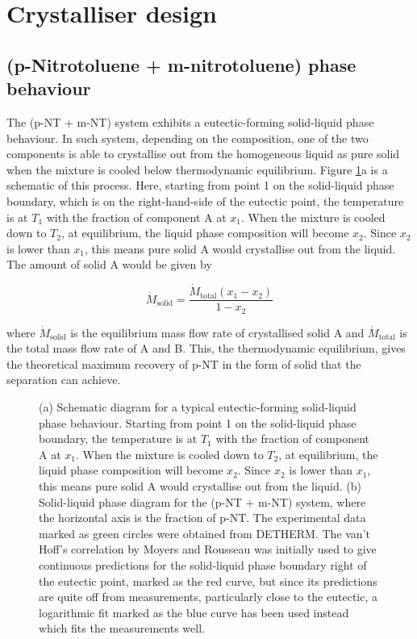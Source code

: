 \section{Crystalliser design}

\subsection{(p-Nitrotoluene + m-nitrotoluene) phase behaviour}

The (p-NT + m-NT) system exhibits a eutectic-forming solid-liquid phase behaviour. In such system, depending on the composition, one of the two components is able to crystallise out from the homogeneous liquid as pure solid when the mixture is cooled below thermodynamic equilibrium. \cite{seader_separation_2011} Figure \ref{fig:eutectic schematic}a is a schematic of this process. Here, starting from point 1 on the solid-liquid phase boundary, which is on the right-hand-side of the eutectic point, the temperature is at $T_1$ with the fraction of component A at $x_1$. When the mixture is cooled down to $T_2$, at equilibrium, the liquid phase composition will become $x_2$. Since $x_2$ is lower than $x_1$, this means pure solid A would crystallise out from the liquid. The amount of solid A would be given by

\begin{equation}\label{eq:amount solid A equilibrium}
    \dot{M}_{\mathrm{solid}} = \frac{\dot{M}_{\mathrm{total}} (x_1 - x_2)}{1 - x_2}
\end{equation}

\noindent where $\dot{M}_{\mathrm{solid}}$ is the equilibrium mass flow rate of crystallised solid A and $\dot{M}_{\mathrm{total}}$ is the total mass flow rate of A and B. This, the thermodynamic equilibrium, gives the theoretical maximum recovery of p-NT in the form of solid that the separation can achieve.

\begin{figure}[h]
    \centering
    
    \caption{(a) Schematic diagram for a typical eutectic-forming solid-liquid phase behaviour. Starting from point 1 on the solid-liquid phase boundary, the temperature is at $T_1$ with the fraction of component A at $x_1$. When the mixture is cooled down to $T_2$, at equilibrium, the liquid phase composition will become $x_2$. Since $x_2$ is lower than $x_1$, this means pure solid A would crystallise out from the liquid.  (b) Solid-liquid phase diagram for the (p-NT + m-NT) system, where the horizontal axis is the fraction of p-NT. The experimental data marked as green circles were obtained from DETHERM. \cite{noauthor_detherm_2021} The van't Hoff's correlation by Moyers and Rousseau was initially used to give continuous predictions for the solid-liquid phase boundary right of the eutectic point, \cite{moyers_crystallization_1987} marked as the red curve, but since its predictions are quite off from measurements, particularly close to the eutectic, a logarithmic fit marked as the blue curve has been used instead which fits the measurements well.}
    \label{fig:eutectic schematic}
\end{figure}

